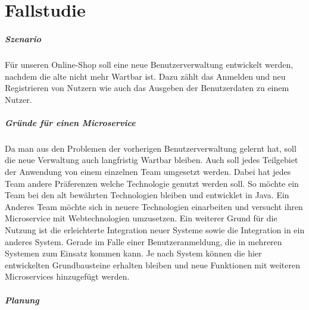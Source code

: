 \chapter{Fallstudie}\label{ch:Fallstudie}
\paragraph{Szenario}
Für unseren Online-Shop soll eine neue Benutzerverwaltung entwickelt werden, nachdem die alte nicht mehr Wartbar ist. Dazu zählt das Anmelden und neu Registrieren von Nutzern wie auch das Ausgeben der Benutzerdaten zu einem Nutzer.

\paragraph{Gründe für einen Microservice}
Da man aus den Problemen der vorherigen Benutzerverwaltung gelernt hat, soll die neue Verwaltung auch langfristig Wartbar bleiben.\newline
Auch soll jedes Teilgebiet der Anwendung von einem einzelnen Team umgesetzt werden. Dabei hat jedes Team andere Präferenzen welche Technologie genutzt werden soll. So möchte ein Team bei den alt bewährten Technologien bleiben und entwicklet in Java. Ein Anderes Team möchte sich in neuere Technologien einarbeiten und versucht ihren Microservice mit Webtechnologien umzusetzen. \newline
Ein weiterer Grund für die Nutzung ist die erleichterte Integration neuer Systeme sowie die Integration in ein anderes System. Gerade im Falle einer Benutzeranmeldung, die in mehreren Systemen zum Einsatz kommen kann. Je nach System können die hier entwickelten Grundbausteine erhalten bleiben und neue Funktionen mit weiteren Microservices hinzugefügt werden.

\paragraph{Planung}

